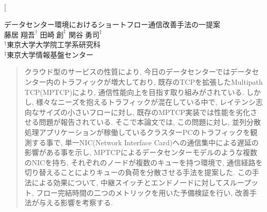 \documentclass[11pt, a4paper, twocolumn]{jsarticle}
\begin{document}

\twocolumn[
\vspace{1.5cm}
\begin{center}
{\Large データセンター環境におけるショートフロー通信改善手法の一提案}\\
\vspace{1em}
{\large $藤居\;翔吾^{\dagger}$ \hspace{1.0cm}$田崎\;創^{\ddagger}$ \hspace{1.0cm}
$関谷\;勇司^{\ddagger}$}\\
${}^{\dagger}$東京大学大学院工学系研究科\\
${}^{\ddagger}$東京大学情報基盤センター \\
\end{center}
\begin{quotation}
\begin{spacing}{0.6}
{\footnotesize クラウド型のサービスの性質により, 今日のデータセンターではデータセンター内のトラフィックが増大しており,
既存のTCPを拡張したMultipath TCP(MPTCP)により, 通信性能向上を目指す取り組みがされている.
しかし, 様々なニーズを抱えるトラフィックが混在している中で, レイテンシ志向なサイズの小さいフローに対し,
既存のMPTCP実装では性能を劣化させる問題が報告されている.
そこで本論文では, この問題に対し, 並列分散処理アプリケーションが稼働しているクラスターPCのトラフィックを観測する事で, 単一NIC(Network
Interface Card)への通信集中による遅延の影響がある事を示し,
MPTCPによるデータセンターモデルのような複数のNICを持ち, それぞれのノードが複数のキューを持つ環境で,
通信経路を切り替えることによりキューの負荷を分散させる手法を提案した.
この手法による効果について, 中継スイッチとエンドノードに対してスループット, フロー完結時間の二つのメトリックを用いた予備検証を行い,
改善手法が与える影響を考察する.
}
\end{spacing}
\end{quotation}
\end{document}
